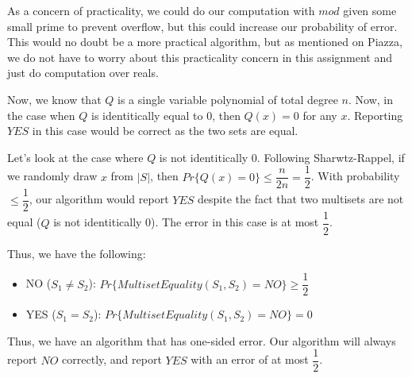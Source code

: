 \documentclass{article}
\begin{document}
As a concern of practicality, we could do our computation with $mod$ given some small prime to prevent overflow, but
this could increase our probability of error. This would no doubt be a more practical algorithm, but as mentioned on
Piazza, we do not have to worry about this practicality concern in this assignment and just do computation over reals.

Now, we know that $Q$ is a single variable polynomial of total degree $n$. Now, in the case when $Q$ is identitically
equal to 0, then $Q(x) = 0$ for any $x$. Reporting $YES$ in this case would be correct as the two sets are equal.

Let's look at the case where $Q$ is not identitically 0. Following Sharwtz-Rappel, if we randomly draw $x$ from $|S|$,
then $Pr\{Q(x) = 0\} \leq \dfrac{n}{2n} = \dfrac{1}{2}$. With probability $\leq \dfrac{1}{2}$, our algorithm would
report $YES$ despite the fact that two multisets are not equal ($Q$ is not identitically 0). The error in this case is
at most $\dfrac{1}{2}$.

Thus, we have the following:
\begin{itemize}
    \item NO ($S_1 \neq S_2$): $Pr\{MultisetEquality(S_1, S_2) = NO\} \geq \dfrac{1}{2}$
    \item YES ($S_1 = S_2$): $Pr\{MultisetEquality(S_1, S_2) = NO\} = 0$
\end{itemize}

Thus, we have an algorithm that has one-sided error. Our algorithm will always report $NO$ correctly, and report $YES$
with an error of at most $\dfrac{1}{2}$.
\end{document}
